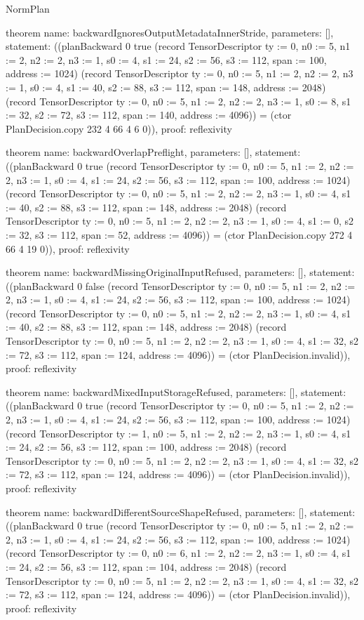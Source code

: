 \begin{lexlean}{NormPlan}
\begin{semanticmodule}
theorem{
  name: backwardIgnoresOutputMetadataInnerStride,
  parameters: [],
  statement: ((planBackward 0 true (record TensorDescriptor {ty := 0, n0 := 5, n1 := 2, n2 := 2, n3 := 1, s0 := 4, s1 := 24, s2 := 56, s3 := 112, span := 100, address := 1024}) (record TensorDescriptor {ty := 0, n0 := 5, n1 := 2, n2 := 2, n3 := 1, s0 := 4, s1 := 40, s2 := 88, s3 := 112, span := 148, address := 2048}) (record TensorDescriptor {ty := 0, n0 := 5, n1 := 2, n2 := 2, n3 := 1, s0 := 8, s1 := 32, s2 := 72, s3 := 112, span := 140, address := 4096})) = (ctor PlanDecision.copy 232 4 66 4 6 0)),
  proof: reflexivity{}
}

theorem{
  name: backwardOverlapPreflight,
  parameters: [],
  statement: ((planBackward 0 true (record TensorDescriptor {ty := 0, n0 := 5, n1 := 2, n2 := 2, n3 := 1, s0 := 4, s1 := 24, s2 := 56, s3 := 112, span := 100, address := 1024}) (record TensorDescriptor {ty := 0, n0 := 5, n1 := 2, n2 := 2, n3 := 1, s0 := 4, s1 := 40, s2 := 88, s3 := 112, span := 148, address := 2048}) (record TensorDescriptor {ty := 0, n0 := 5, n1 := 2, n2 := 2, n3 := 1, s0 := 4, s1 := 0, s2 := 32, s3 := 112, span := 52, address := 4096})) = (ctor PlanDecision.copy 272 4 66 4 19 0)),
  proof: reflexivity{}
}

theorem{
  name: backwardMissingOriginalInputRefused,
  parameters: [],
  statement: ((planBackward 0 false (record TensorDescriptor {ty := 0, n0 := 5, n1 := 2, n2 := 2, n3 := 1, s0 := 4, s1 := 24, s2 := 56, s3 := 112, span := 100, address := 1024}) (record TensorDescriptor {ty := 0, n0 := 5, n1 := 2, n2 := 2, n3 := 1, s0 := 4, s1 := 40, s2 := 88, s3 := 112, span := 148, address := 2048}) (record TensorDescriptor {ty := 0, n0 := 5, n1 := 2, n2 := 2, n3 := 1, s0 := 4, s1 := 32, s2 := 72, s3 := 112, span := 124, address := 4096})) = (ctor PlanDecision.invalid)),
  proof: reflexivity{}
}

theorem{
  name: backwardMixedInputStorageRefused,
  parameters: [],
  statement: ((planBackward 0 true (record TensorDescriptor {ty := 0, n0 := 5, n1 := 2, n2 := 2, n3 := 1, s0 := 4, s1 := 24, s2 := 56, s3 := 112, span := 100, address := 1024}) (record TensorDescriptor {ty := 1, n0 := 5, n1 := 2, n2 := 2, n3 := 1, s0 := 4, s1 := 24, s2 := 56, s3 := 112, span := 100, address := 2048}) (record TensorDescriptor {ty := 0, n0 := 5, n1 := 2, n2 := 2, n3 := 1, s0 := 4, s1 := 32, s2 := 72, s3 := 112, span := 124, address := 4096})) = (ctor PlanDecision.invalid)),
  proof: reflexivity{}
}

theorem{
  name: backwardDifferentSourceShapeRefused,
  parameters: [],
  statement: ((planBackward 0 true (record TensorDescriptor {ty := 0, n0 := 5, n1 := 2, n2 := 2, n3 := 1, s0 := 4, s1 := 24, s2 := 56, s3 := 112, span := 100, address := 1024}) (record TensorDescriptor {ty := 0, n0 := 6, n1 := 2, n2 := 2, n3 := 1, s0 := 4, s1 := 24, s2 := 56, s3 := 112, span := 104, address := 2048}) (record TensorDescriptor {ty := 0, n0 := 5, n1 := 2, n2 := 2, n3 := 1, s0 := 4, s1 := 32, s2 := 72, s3 := 112, span := 124, address := 4096})) = (ctor PlanDecision.invalid)),
  proof: reflexivity{}
}


\end{semanticmodule}
\end{lexlean}
